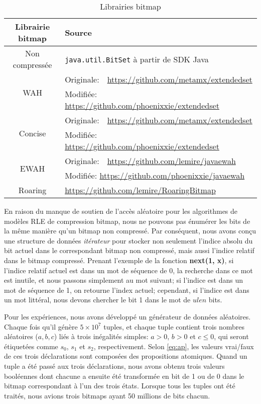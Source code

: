 \begin{table}
\centering
\begin{tabular}{|c|l|}
\hline
Librairie bitmap & Source \\
\hline
Non compressée & \texttt{java.util.BitSet} à partir de SDK Java  \\
\hline
\multirow{2}{*}{WAH} & Originale:\ \ \url{https://github.com/metamx/extendedset} \\
& Modifiée: \url{https://github.com/phoenixxie/extendedset} \\
\hline
\multirow{2}{*}{Concise} & Originale:\ \ \url{https://github.com/metamx/extendedset} \\
& Modifiée: \url{https://github.com/phoenixxie/extendedset} \\
\hline
\multirow{2}{*}{EWAH} & Originale:\ \ \url{https://github.com/lemire/javaewah} \\
& Modifiée: \url{https://github.com/phoenixxie/javaewah} \\
\hline
Roaring & \url{https://github.com/lemire/RoaringBitmap} \\
\hline
\end{tabular}
\caption{Librairies bitmap}
\label{table:bmlibs}
\end{table}

En raison du manque de soutien de l'accès aléatoire pour les algorithmes de modèles RLE de compression bitmap, nous ne pouvons pas énumérer les bits de la même manière qu'un bitmap non compressé. Par conséquent, nous avons conçu une structure de données \emph{itérateur} pour stocker non seulement l'indice absolu du bit actuel dans le correspondant bitmap non compressé, mais aussi l'indice relatif dans le bitmap compressé. Prenant l'exemple de la fonction \textbf{next(1, x)}, si l'indice relatif actuel est dans un mot de séquence de 0, la recherche dans ce mot est inutile, et nous passons simplement au mot suivant; si l'indice est dans un mot de séquence de 1, on retourne l'index actuel; cependant, si l'indice est dans un mot littéral, nous devons chercher le bit 1 dans le mot de $ulen$ bits.

Pour les expériences, nous avons développé un générateur de données aléatoires. Chaque fois qu'il génère $5 \times 10^7$ tuples, et chaque tuple contient trois nombres aléatoires ($a, b, c$) liés à trois inégalités simples: $a > 0$, $b > 0$ et $c \leq 0$, qui seront étiquetées comme $s_0$, $s_1$ et $s_2$, respectivement. Selon \eqref{eq:ap}, les valeurs vrai/faux de ces trois déclarations sont composées des propositions atomiques. Quand un tuple a été passé aux trois déclarations, nous avons obtenu trois valeurs booléennes dont chacune a ensuite été transformée en bit de 1 ou de 0 dans le bitmap correspondant à l'un des trois états. Lorsque tous les tuples ont été traités, nous avions trois bitmaps ayant 50 millions de bits chacun.

